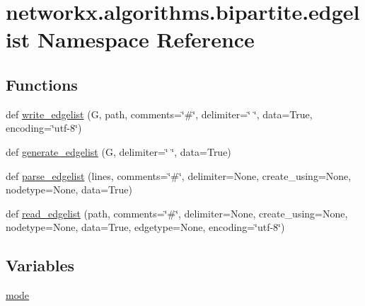 \hypertarget{namespacenetworkx_1_1algorithms_1_1bipartite_1_1edgelist}{}\section{networkx.\+algorithms.\+bipartite.\+edgelist Namespace Reference}
\label{namespacenetworkx_1_1algorithms_1_1bipartite_1_1edgelist}
\subsection*{Functions}
\begin{DoxyCompactItemize}
\item 
def \hyperlink{namespacenetworkx_1_1algorithms_1_1bipartite_1_1edgelist_a4a4a5c6bb34fb2d6fc90af46921b9362}{write\+\_\+edgelist} (G, path, comments=\char`\"{}\#\char`\"{}, delimiter=\char`\"{} \char`\"{}, data=True, encoding=\char`\"{}utf-\/8\char`\"{})
\item 
def \hyperlink{namespacenetworkx_1_1algorithms_1_1bipartite_1_1edgelist_a266599de891eacaa2b95b9c8af109b0a}{generate\+\_\+edgelist} (G, delimiter=\char`\"{} \char`\"{}, data=True)
\item 
def \hyperlink{namespacenetworkx_1_1algorithms_1_1bipartite_1_1edgelist_afeb373f6e6e573ef4c4e28751ed3b015}{parse\+\_\+edgelist} (lines, comments=\char`\"{}\#\char`\"{}, delimiter=None, create\+\_\+using=None, nodetype=None, data=True)
\item 
def \hyperlink{namespacenetworkx_1_1algorithms_1_1bipartite_1_1edgelist_a7a2bfc7f57eb2ce55cc6fef9331c8793}{read\+\_\+edgelist} (path, comments=\char`\"{}\#\char`\"{}, delimiter=None, create\+\_\+using=None, nodetype=None, data=True, edgetype=None, encoding=\char`\"{}utf-\/8\char`\"{})
\end{DoxyCompactItemize}
\subsection*{Variables}
\begin{DoxyCompactItemize}
\item 
\hyperlink{namespacenetworkx_1_1algorithms_1_1bipartite_1_1edgelist_a87863ab361ffba11ec470920ec5f2f6f}{mode}
\end{DoxyCompactItemize}


